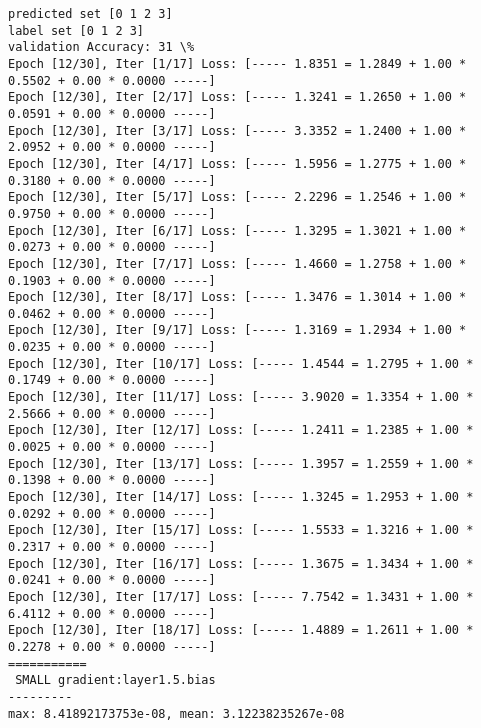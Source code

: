 \documentclass[11pt]{article}
\begin{document}
    \begin{Verbatim}[commandchars=\\\{\}]
predicted set [0 1 2 3]
label set [0 1 2 3]
validation Accuracy: 31 \%
Epoch [12/30], Iter [1/17] Loss: [----- 1.8351 = 1.2849 + 1.00 * 0.5502 + 0.00 * 0.0000 -----]
Epoch [12/30], Iter [2/17] Loss: [----- 1.3241 = 1.2650 + 1.00 * 0.0591 + 0.00 * 0.0000 -----]
Epoch [12/30], Iter [3/17] Loss: [----- 3.3352 = 1.2400 + 1.00 * 2.0952 + 0.00 * 0.0000 -----]
Epoch [12/30], Iter [4/17] Loss: [----- 1.5956 = 1.2775 + 1.00 * 0.3180 + 0.00 * 0.0000 -----]
Epoch [12/30], Iter [5/17] Loss: [----- 2.2296 = 1.2546 + 1.00 * 0.9750 + 0.00 * 0.0000 -----]
Epoch [12/30], Iter [6/17] Loss: [----- 1.3295 = 1.3021 + 1.00 * 0.0273 + 0.00 * 0.0000 -----]
Epoch [12/30], Iter [7/17] Loss: [----- 1.4660 = 1.2758 + 1.00 * 0.1903 + 0.00 * 0.0000 -----]
Epoch [12/30], Iter [8/17] Loss: [----- 1.3476 = 1.3014 + 1.00 * 0.0462 + 0.00 * 0.0000 -----]
Epoch [12/30], Iter [9/17] Loss: [----- 1.3169 = 1.2934 + 1.00 * 0.0235 + 0.00 * 0.0000 -----]
Epoch [12/30], Iter [10/17] Loss: [----- 1.4544 = 1.2795 + 1.00 * 0.1749 + 0.00 * 0.0000 -----]
Epoch [12/30], Iter [11/17] Loss: [----- 3.9020 = 1.3354 + 1.00 * 2.5666 + 0.00 * 0.0000 -----]
Epoch [12/30], Iter [12/17] Loss: [----- 1.2411 = 1.2385 + 1.00 * 0.0025 + 0.00 * 0.0000 -----]
Epoch [12/30], Iter [13/17] Loss: [----- 1.3957 = 1.2559 + 1.00 * 0.1398 + 0.00 * 0.0000 -----]
Epoch [12/30], Iter [14/17] Loss: [----- 1.3245 = 1.2953 + 1.00 * 0.0292 + 0.00 * 0.0000 -----]
Epoch [12/30], Iter [15/17] Loss: [----- 1.5533 = 1.3216 + 1.00 * 0.2317 + 0.00 * 0.0000 -----]
Epoch [12/30], Iter [16/17] Loss: [----- 1.3675 = 1.3434 + 1.00 * 0.0241 + 0.00 * 0.0000 -----]
Epoch [12/30], Iter [17/17] Loss: [----- 7.7542 = 1.3431 + 1.00 * 6.4112 + 0.00 * 0.0000 -----]
Epoch [12/30], Iter [18/17] Loss: [----- 1.4889 = 1.2611 + 1.00 * 0.2278 + 0.00 * 0.0000 -----]
===========
 SMALL gradient:layer1.5.bias
---------
max: 8.41892173753e-08, mean: 3.12238235267e-08

    \end{Verbatim}

    \begin{center}
    \end{center}
    { \hspace*{\fill} \\}
    
    \begin{center}
    \end{center}
    { \hspace*{\fill} \\}
    
\end{document}
